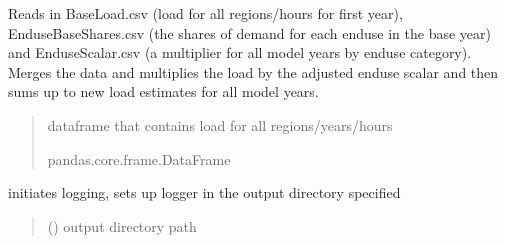 \documentclass[letterpaper,10pt,english]{sphinxmanual}
\begin{document}

\begin{fulllineitems}
\label{\detokenize{src.common.utilities:src.common.utilities.scale_load_with_enduses}}
\pysigstartsignatures
\pysiglinewithargsret
{}
{}
{}
\pysigstopsignatures
\sphinxAtStartPar
Reads in BaseLoad.csv (load for all regions/hours for first year), EnduseBaseShares.csv
(the shares of demand for each enduse in the base year) and EnduseScalar.csv (a multiplier
for all model years by enduse category). Merges the data and multiplies the load by the
adjusted enduse scalar and then sums up to new load estimates for all model years.
\begin{quote}\begin{description}
\sphinxAtStartPar
dataframe that contains load for all regions/years/hours

\sphinxAtStartPar
pandas.core.frame.DataFrame

\end{description}\end{quote}

\end{fulllineitems}


\begin{fulllineitems}
\label{\detokenize{src.common.utilities:src.common.utilities.setup_logger}}
\pysigstartsignatures
\pysiglinewithargsret
{}
{}
{}
\pysigstopsignatures
\sphinxAtStartPar
initiates logging, sets up logger in the output directory specified
\begin{quote}\begin{description}
\sphinxAtStartPar
{} () \textendash{} output directory path

\end{description}\end{quote}

\end{fulllineitems}
\end{document}

